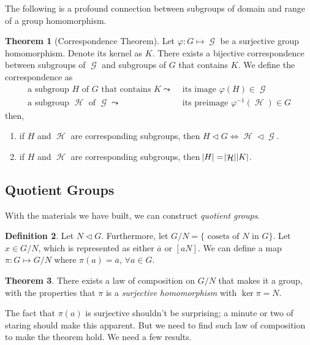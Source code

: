 \documentclass[11pt]{amsart} %
\theoremstyle{definition}
\newtheorem{definition}{Definition}[section]
\newtheorem{theorem}[definition]{Theorem}
\theoremstyle{definition}
\DeclareMathOperator{\GG}{\mathcal{G}}
\DeclareMathOperator{\HH}{\mathcal{H}}
\numberwithin{equation}{section}
\newcommand{\qgroup}[2]{#1 / #2}
\begin{document}
The following is a profound connection between subgroups of domain and range of a group homomorphism.

\begin{theorem}[Correspondence Theorem]
	\label{thmcorrespondencetheorem}
	Let $\varphi: G \mapsto \GG$ be a surjective group homomorphism. Denote its kernel as $K$. There exists a bijective correspondence between subgroups of $\GG$ and subgroups of $G$ that contains $K$. We define the correspondence as
	\begin{align*}
	\text{a subgroup } H \text{ of } G \text{ that contains } K  \leadsto & \text{ its image } \varphi(H) \in \GG \\
	\text{a subgroup } \HH \text{ of } \GG  \leadsto & \text{ its preimage } \varphi^{-1} (\HH) \in G
	\end{align*}
	then,
	\begin{enumerate}
		\item if $H$ and $\HH$ are corresponding subgroups, then $H \lhd G \iff \HH \lhd \GG$.
		\item if $H$ and $\HH$ are corresponding subgroups, then $\abs{H} = \abs{\HH} \abs{K}$.
	\end{enumerate}
\end{theorem}


\subsection{Quotient Groups}
With the materials we have built, we can construct \textit{quotient groups}.

\begin{definition}
	Let $N \lhd G$. Furthermore, let $ \qgroup{G}{N} = \{ \text{ cosets of $N$ in $G$}  \}$. Let $x \in \qgroup{G}{N}$, which is represented as either $\overline{a}$ or $[aN]$. We can define a map $\pi : G \mapsto \qgroup{G}{N}$ where $\pi (a) = \overline{a}$, $\forall a \in G$.
\end{definition}

\begin{theorem}
	\label{derivativeOfFIT}
	There exists a law of composition on $\qgroup{G}{N}$ that makes it a group, with the properties that $\pi$ is a \textit{surjective homomorphism} with $\ker \pi = N$.
\end{theorem}

The fact that $\pi(a)$ is surjective shouldn't be surprising; a minute or two of staring should make this apparent. But we need to find such law of composition to make the theorem hold. We need a few results.
\end{document}
